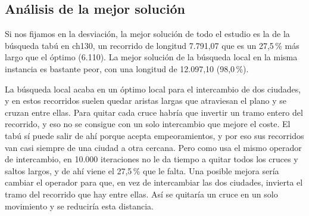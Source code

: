 \subsection{Análisis de la mejor solución}

Si nos fijamos en la desviación, la mejor solución de todo el estudio es la de la búsqueda tabú en ch130, un recorrido de longitud 7.791,07 que es un 27,5\,\% más largo que el óptimo (6.110). La mejor solución de la búsqueda local en la misma instancia es bastante peor, con una longitud de 12.097,10 (98,0\,\%).

La búsqueda local acaba en un óptimo local para el intercambio de dos ciudades, y en estos recorridos suelen quedar aristas largas que atraviesan el plano y se cruzan entre ellas. Para quitar cada cruce habría que invertir un tramo entero del recorrido, y eso no se consigue con un solo intercambio que mejore el coste. El tabú sí puede salir de ahí porque acepta empeoramientos, y por eso sus recorridos van casi siempre de una ciudad a otra cercana. Pero como usa el mismo operador de intercambio, en 10.000 iteraciones no le da tiempo a quitar todos los cruces y saltos largos, y de ahí viene el 27,5\,\% que le falta. Una posible mejora sería cambiar el operador para que, en vez de intercambiar las dos ciudades, invierta el tramo del recorrido que hay entre ellas. Así se quitaría un cruce en un solo movimiento y se reduciría esta distancia.
